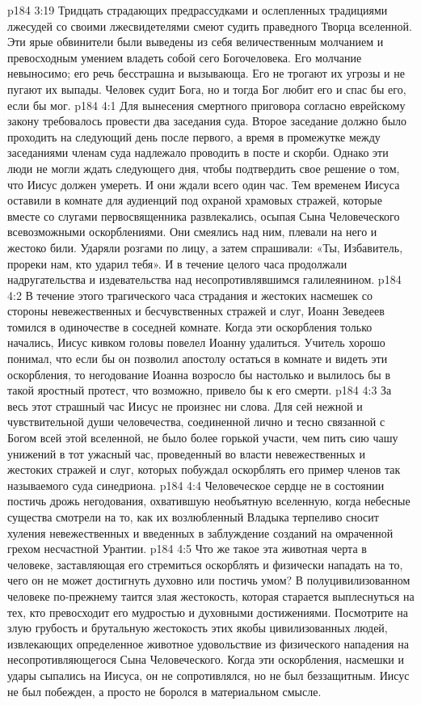 \vs p184 3:19 \pc Тридцать страдающих предрассудками и ослепленных традициями лжесудей со своими лжесвидетелями смеют судить праведного Творца вселенной. Эти ярые обвинители были выведены из себя величественным молчанием и превосходным умением владеть собой сего Богочеловека. Его молчание невыносимо; его речь бесстрашна и вызывающа. Его не трогают их угрозы и не пугают их выпады. Человек судит Бога, но и тогда Бог любит его и спас бы его, если бы мог.
\vs p184 4:1 Для вынесения смертного приговора согласно еврейскому закону требовалось провести два заседания суда. Второе заседание должно было проходить на следующий день после первого, а время в промежутке между заседаниями членам суда надлежало проводить в посте и скорби. Однако эти люди не могли ждать следующего дня, чтобы подтвердить свое решение о том, что Иисус должен умереть. И они ждали всего один час. Тем временем Иисуса оставили в комнате для аудиенций под охраной храмовых стражей, которые вместе со слугами первосвященника развлекались, осыпая Сына Человеческого всевозможными оскорблениями. Они смеялись над ним, плевали на него и жестоко били. Ударяли розгами по лицу, а затем спрашивали: «Ты, Избавитель, прореки нам, кто ударил тебя». И в течение целого часа продолжали надругательства и издевательства над несопротивлявшимся галилеянином.
\vs p184 4:2 В течение этого трагического часа страдания и жестоких насмешек со стороны невежественных и бесчувственных стражей и слуг, Иоанн Зеведеев томился в одиночестве в соседней комнате. Когда эти оскорбления только начались, Иисус кивком головы повелел Иоанну удалиться. Учитель хорошо понимал, что если бы он позволил апостолу остаться в комнате и видеть эти оскорбления, то негодование Иоанна возросло бы настолько и вылилось бы в такой яростный протест, что возможно, привело бы к его смерти.
\vs p184 4:3 За весь этот страшный час Иисус не произнес ни слова. Для сей нежной и чувствительной души человечества, соединенной лично и тесно связанной с Богом всей этой вселенной, не было более горькой участи, чем пить сию чашу унижений в тот ужасный час, проведенный во власти невежественных и жестоких стражей и слуг, которых побуждал оскорблять его пример членов так называемого суда синедриона.
\vs p184 4:4 \pc Человеческое сердце не в состоянии постичь дрожь негодования, охватившую необъятную вселенную, когда небесные существа смотрели на то, как их возлюбленный Владыка терпеливо сносит хуления невежественных и введенных в заблуждение созданий на омраченной грехом несчастной Урантии.
\vs p184 4:5 Что же такое эта животная черта в человеке, заставляющая его стремиться оскорблять и физически нападать на то, чего он не может достигнуть духовно или постичь умом? В полуцивилизованном человеке по\hyp{}прежнему таится злая жестокость, которая старается выплеснуться на тех, кто превосходит его мудростью и духовными достижениями. Посмотрите на злую грубость и брутальную жестокость этих якобы цивилизованных людей, извлекающих определенное животное удовольствие из физического нападения на несопротивляющегося Сына Человеческого. Когда эти оскорбления, насмешки и удары сыпались на Иисуса, он не сопротивлялся, но не был беззащитным. Иисус не был побежден, а просто не боролся в материальном смысле.
